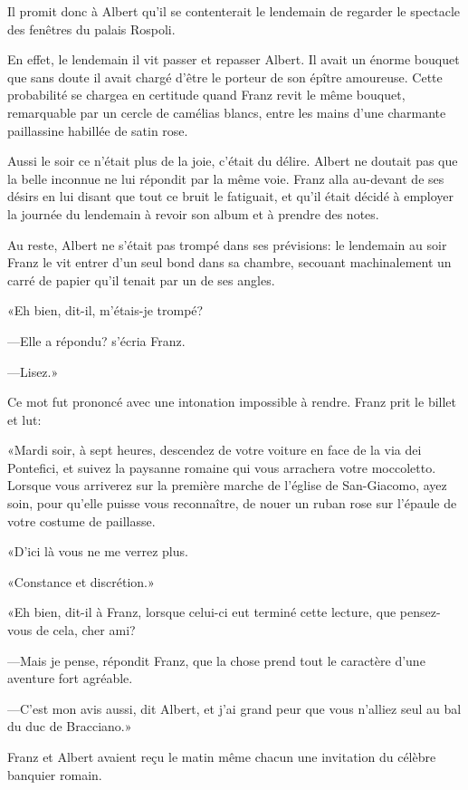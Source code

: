 Il promit donc à Albert qu'il se contenterait le lendemain de regarder le spectacle des fenêtres du palais Rospoli. 

En effet, le lendemain il vit passer et repasser Albert. Il avait un énorme bouquet que sans doute il avait chargé d'être le porteur de son épître amoureuse. Cette probabilité se chargea en certitude quand Franz revit le même bouquet, remarquable par un cercle de camélias blancs, entre les mains d'une charmante paillassine habillée de satin rose. 

Aussi le soir ce n'était plus de la joie, c'était du délire. Albert ne doutait pas que la belle inconnue ne lui répondit par la même voie. Franz alla au-devant de ses désirs en lui disant que tout ce bruit le fatiguait, et qu'il était décidé à employer la journée du lendemain à revoir son album et à prendre des notes. 

Au reste, Albert ne s'était pas trompé dans ses prévisions: le lendemain au soir Franz le vit entrer d'un seul bond dans sa chambre, secouant machinalement un carré de papier qu'il tenait par un de ses angles. 

«Eh bien, dit-il, m'étais-je trompé? 

—Elle a répondu? s'écria Franz. 

—Lisez.» 

Ce mot fut prononcé avec une intonation impossible à rendre. Franz prit le billet et lut: 

«Mardi soir, à sept heures, descendez de votre voiture en face de la via dei Pontefici, et suivez la paysanne romaine qui vous arrachera votre moccoletto. Lorsque vous arriverez sur la première marche de l'église de San-Giacomo, ayez soin, pour qu'elle puisse vous reconnaître, de nouer un ruban rose sur l'épaule de votre costume de paillasse. 

«D'ici là vous ne me verrez plus. 

«Constance et discrétion.» 

«Eh bien, dit-il à Franz, lorsque celui-ci eut terminé cette lecture, que pensez-vous de cela, cher ami? 

—Mais je pense, répondit Franz, que la chose prend tout le caractère d'une aventure fort agréable. 

—C'est mon avis aussi, dit Albert, et j'ai grand peur que vous n'alliez seul au bal du duc de Bracciano.» 

Franz et Albert avaient reçu le matin même chacun une invitation du célèbre banquier romain. 

